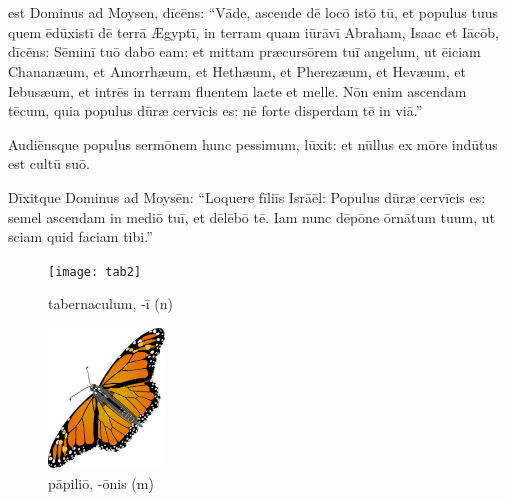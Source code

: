 \chapter{}


\thispagestyle{empty}

 est Dominus ad Moysen, dīcēns: ``Vāde, ascende
dē locō istō tū, et populus tuus quem ēdūxistī dē terrā Ægyptī, in terram
quam iūrāvī Abraham, Isaac et Iācōb, dīcēns:
Sēminī tuō dabō eam: 
et mittam præcursōrem tuī
angelum, ut ēiciam Chananæum, et
Amorrhæum, et Hethæum, et Pherezæum, et Hevæum, et Iebusæum, 
et intrēs in
terram fluentem lacte et melle. Nōn enim ascendam tēcum, quia populus dūræ
cervīcis es: nē
forte disperdam tē in viā.''

Audiēnsque
populus sermōnem hunc pessimum, lūxit: et nūllus ex mōre indūtus est cultū
suō. 

Dīxitque Dominus ad Moysēn: ``Loquere fīliīs Isrāēl:
Populus dūræ cervīcis es: semel ascendam in mediō tuī, et dēlēbō tē. Iam
nunc dēpōne ōrnātum tuum, ut sciam quid faciam tibi.''

\begin{figure}[h!]
    \begin{minipage}[hp]{0.5\linewidth}
        \centering
        \texttt{[image: tab2]}
        \caption{tabernaculum, -ī (n)}
    \end{minipage}%
    \begin{minipage}[hp]{0.5\linewidth}
        \centering
        \includegraphics{papilio}
        \caption{pāpiliō, -ōnis (m)}
    \end{minipage}
\end{figure}

